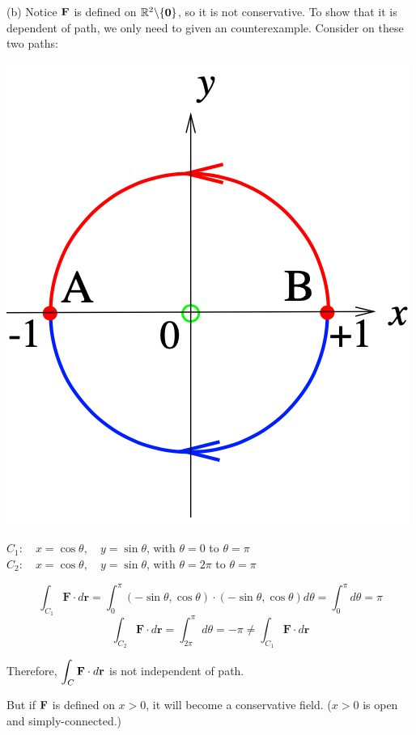 \documentclass[11pt, a4paper]{MATH2023}
\newcommand{\FF}{{\bf F}}
\begin{document}
\begin{spacing}{1.3}
    (b) Notice $\FF$ is defined on $\mathbb{R}^2\backslash \{{\bf 0}\}$, so it is not conservative.
    To show that it is dependent of path, we only need to given an counterexample. Consider on these two paths:
    \begin{center}
        \includegraphics[scale=0.4]{images/Ch15-ex2.3.png}
    \end{center}
    $C_{1}: \quad x=\cos \theta, \quad y=\sin \theta$, with $\theta = 0$ to $\theta = \pi$\\
    $C_{2}: \quad x=\cos \theta, \quad y=\sin \theta$, with $\theta = 2\pi$ to $\theta = \pi$

    $$\int_{C_{1}} \mathbf{F} \cdot d \mathbf{r}=\int_{0}^{\pi}(-\sin \theta, \cos \theta) \cdot(-\sin \theta, \cos \theta) d \theta=\int_{0}^{\pi} d \theta=\pi$$
    $$\int_{C_{2}} \mathbf{F} \cdot d \mathbf{r}=\int_{2 \pi}^{\pi} d \theta=-\pi \neq \int_{C_{1}} \mathbf{F} \cdot d \mathbf{r}$$

    Therefore, $\displaystyle \int_{C} \mathbf{F} \cdot d \mathbf{r}$ is not independent of path.

    \vspace{0.3in}
    {\blue But if $\FF$ is defined on $x>0$, it will become a conservative field. ($x>0$ is open and simply-connected.)}



\end{spacing}
\end{document}
